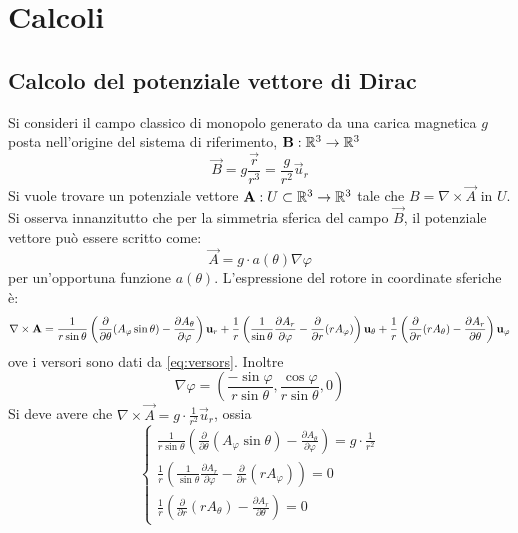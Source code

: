 \section{Calcoli}
\subsection{Calcolo del potenziale vettore di Dirac}
\label{sec:dirac_potential}
Si consideri il campo classico di monopolo generato da una carica magnetica $g$ posta
nell'origine del sistema di riferimento, $\vec B : \R ^3 \to \R ^3$
    $$ \vec B = g\frac{\vec r}{r^3} = \frac{g}{r^2} \vec u _r $$
Si vuole trovare un potenziale vettore $\vec A : U \subset \R ^3 \to \R ^3$ tale che
$ B = \nabla \times \vec A $ in $U$. Si osserva innanzitutto che per la simmetria
sferica del campo $\vec B$, il potenziale vettore può essere scritto come:
   $$ \vec A = g \cdot a(\theta) \nabla \varphi $$
per un'opportuna funzione $a(\theta)$.
L'espressione del rotore in coordinate sferiche è:
$$
    \nabla \times \vec A =
         \frac{1}{r\sin\theta} \left(
              \frac{\partial}{\partial\theta}(A_\varphi\sin\theta) -
              \frac{\partial A_\theta}{\partial\varphi}
              \right) \vec u _r \\
         + \frac{1}{r} \left(
              \frac{1}{\sin\theta}\frac{\partial A_r}{\partial\varphi} -
              \frac{\partial}{\partial r}(r A_\varphi)
              \right)\vec u _\theta \\
         + \frac{1}{r} \left(
              \frac{\partial}{\partial r}(r A_\theta) - \frac{\partial A_r}{\partial\theta}
              \right)\vec u _\varphi
$$
ove i versori sono dati da \ref{eq:versors}. Inoltre
$$
   \nabla \varphi = \left( \frac{-\sin\varphi}{r\sin\theta},\frac{\cos\varphi}{r\sin\theta},0 \right)
$$
Si deve avere che $ \nabla \times \vec A = g \cdot \frac{1}{r^2} \vec u _r$,
ossia
$$
\begin{cases}
    \frac{1}{r\sin\theta} \left(
         \frac{\partial}{\partial\theta}(A_\varphi\sin\theta) -
         \frac{\partial A_\theta}{\partial\varphi}
         \right) = g \cdot \frac{1}{r^2} \\
    \frac{1}{r} \left(
         \frac{1}{\sin\theta}\frac{\partial A_r}{\partial\varphi} -
         \frac{\partial}{\partial r}(r A_\varphi)
         \right) = 0 \\
    \frac{1}{r} \left(
         \frac{\partial}{\partial r}(r A_\theta) - \frac{\partial A_r}{\partial\theta}
         \right) = 0
\end{cases}
$$
